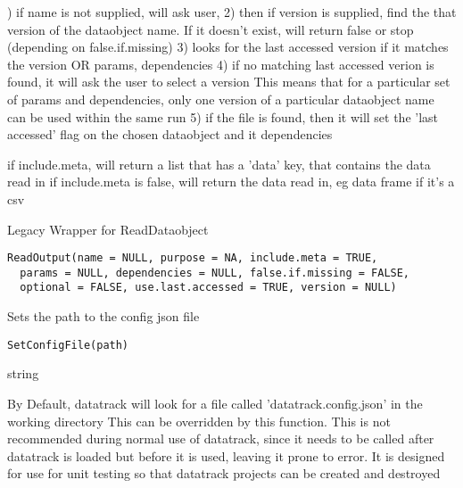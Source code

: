\documentclass[a4paper]{book}
\begin{document}
%
\begin{Details}) if name is not supplied, will ask user,
2) then if version is supplied, find the that version of the dataobject name. If it doesn't exist, will return false or stop (depending on false.if.missing)
3) looks for the last accessed version if it matches the version OR  params, dependencies
4) if no matching last accessed verion is found, it will ask the user to select a version
This means that for a particular set of params and dependencies, only one version of a particular dataobject name can be used within the same run
5) if the file is found, then it will set the 'last accessed' flag
on the chosen dataobject and it dependencies
\end{Details}
%
\begin{Value}
if include.meta, will return a list that has a 'data' key, that contains the data read in if include.meta is false, will return the data read in, eg data frame if it's a csv
\end{Value}
%
\begin{Description}\relax
Legacy Wrapper for ReadDataobject
\end{Description}
%
\begin{Usage}
\begin{verbatim}
ReadOutput(name = NULL, purpose = NA, include.meta = TRUE,
  params = NULL, dependencies = NULL, false.if.missing = FALSE,
  optional = FALSE, use.last.accessed = TRUE, version = NULL)
\end{verbatim}
\end{Usage}
%
\begin{Description}\relax
Sets the path to the config json file
\end{Description}
%
\begin{Usage}
\begin{verbatim}
SetConfigFile(path)
\end{verbatim}
\end{Usage}
%
\begin{Arguments}
\begin{ldescription}
\item[\code{path}] string
\end{ldescription}
\end{Arguments}
%
\begin{Details}\relax
By Default, datatrack will look for a file called 'datatrack.config.json' in the working directory
This can be overridden by this function. This is not recommended during normal use of datatrack,
since it needs to be called after datatrack is loaded but before it is used, leaving it prone to error.
It is designed for use for unit testing so that datatrack projects can be created and destroyed
\end{Details}
\end{document}
